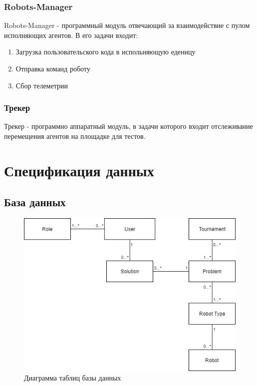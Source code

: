 \documentclass[a4paper,12pt]{article}
\begin{document}
\subsubsection{Robots-Manager}
Robots-Manager - программный модуль отвечающий за взаимодействие с пулом исполняющих агентов. В его задачи входит:
\begin{enumerate}
    \item Загрузка пользовательского кода в испольняющую еденицу
    \item Отправка команд роботу
    \item Сбор телеметрии
\end{enumerate}

\subsubsection{Трекер}
Трекер - программно аппаратный модуль, в задачи которого входит отслеживание перемещения агентов на площадке для тестов. 

\section{Спецификация данных}

\subsection{База данных}

\begin{figure}[H]
    \includegraphics[width=\textwidth]{pictures/database_diagram.png}
    \caption{Диаграмма таблиц базы данных}
    \label{fig:db_diagram}
\end{figure}
\end{document}
